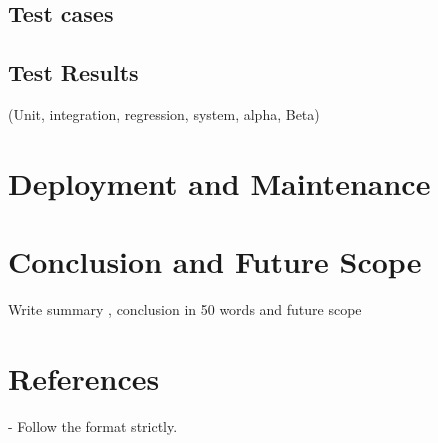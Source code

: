 \documentclass[twoside,a4paper,12pt]{book}
\renewcommand{\appendixname}{Annexure}
\renewcommand{\bibname}{References}
\begin{document}
\section{Test cases}
\section{Test Results}
(Unit, integration, regression, system, alpha, Beta)


\chapter{Deployment and Maintenance}

     
\chapter{Conclusion and Future Scope}
Write  summary , conclusion in 50 words and future scope
 

\chapter*{References}
- Follow the format strictly.
%



\end{document}
